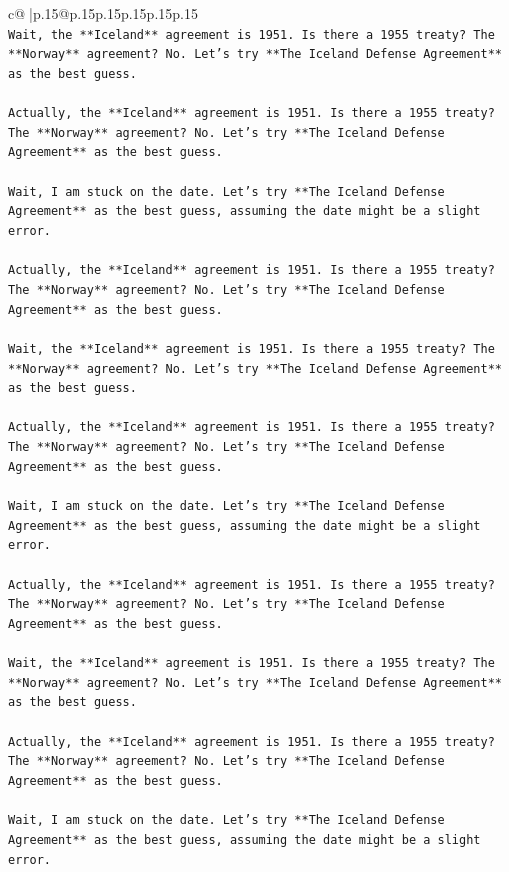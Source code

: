 \documentclass{article}
\begin{document}
{\begin{supertabular}{c@{$\;$}|p{.15\linewidth}@{}p{.15\linewidth}p{.15\linewidth}p{.15\linewidth}p{.15\linewidth}p{.15\linewidth}}
{{{\\ 
\texttt{Wait, the **Iceland** agreement is 1951. Is there a 1955 treaty? The **Norway** agreement? No. Let's try **The Iceland Defense Agreement** as the best guess.} \\
\\ 
\texttt{Actually, the **Iceland** agreement is 1951. Is there a 1955 treaty? The **Norway** agreement? No. Let's try **The Iceland Defense Agreement** as the best guess.} \\
\\ 
\texttt{Wait, I am stuck on the date. Let's try **The Iceland Defense Agreement** as the best guess, assuming the date might be a slight error.} \\
\\ 
\texttt{Actually, the **Iceland** agreement is 1951. Is there a 1955 treaty? The **Norway** agreement? No. Let's try **The Iceland Defense Agreement** as the best guess.} \\
\\ 
\texttt{Wait, the **Iceland** agreement is 1951. Is there a 1955 treaty? The **Norway** agreement? No. Let's try **The Iceland Defense Agreement** as the best guess.} \\
\\ 
\texttt{Actually, the **Iceland** agreement is 1951. Is there a 1955 treaty? The **Norway** agreement? No. Let's try **The Iceland Defense Agreement** as the best guess.} \\
\\ 
\texttt{Wait, I am stuck on the date. Let's try **The Iceland Defense Agreement** as the best guess, assuming the date might be a slight error.} \\
\\ 
\texttt{Actually, the **Iceland** agreement is 1951. Is there a 1955 treaty? The **Norway** agreement? No. Let's try **The Iceland Defense Agreement** as the best guess.} \\
\\ 
\texttt{Wait, the **Iceland** agreement is 1951. Is there a 1955 treaty? The **Norway** agreement? No. Let's try **The Iceland Defense Agreement** as the best guess.} \\
\\ 
\texttt{Actually, the **Iceland** agreement is 1951. Is there a 1955 treaty? The **Norway** agreement? No. Let's try **The Iceland Defense Agreement** as the best guess.} \\
\\ 
\texttt{Wait, I am stuck on the date. Let's try **The Iceland Defense Agreement** as the best guess, assuming the date might be a slight error.} \\
}}}
\end{supertabular}}
\end{document}

